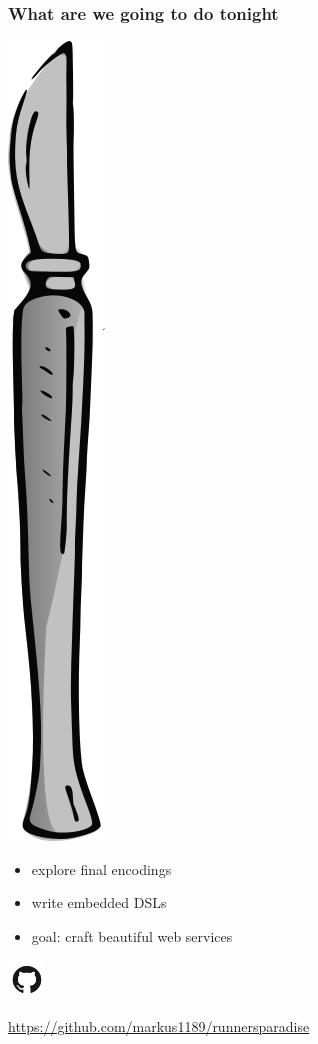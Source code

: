 \documentclass{beamer}
\begin{document}
\begin{frame}
  \frametitle{What are we going to do tonight}
  \begin{minipage}{0.2\linewidth}
    \includegraphics[width=0.19\linewidth]{../pics/scalpel.png}
  \end{minipage}
  \begin{minipage}{0.7\linewidth}
    \begin{itemize}
    \item explore final encodings
    \item write embedded DSLs
    \item goal: craft beautiful web services
    \end{itemize}
  \end{minipage}
  \vfill
  \begin{center}
    \includegraphics[height=10mm]{../pics/github.png}
  \end{center}
  \begin{center}
    \url{https://github.com/markus1189/runnersparadise}
  \end{center}
\end{frame}
\end{document}
